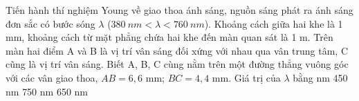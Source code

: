 \begin{vidu} %
 Tiến hành thí nghiệm Young về giao thoa ánh sáng, nguồn sáng phát ra ánh sáng đơn sắc có bước sóng $\lambda $ ($380\ nm < \lambda  < 760\ nm$). Khoảng cách giữa hai khe là 1 mm, khoảng cách từ mặt phẳng chứa hai khe đến màn quan sát là 1 m. Trên màn hai điểm A và B là vị trí vân sáng đối xứng với nhau qua vân trung tâm, C cũng là vị trí vân sáng. Biết A, B, C cùng nằm trên một đường thẳng vuông góc với các vân giao thoa, $AB = 6,6$ mm; $BC = 4,4$ mm. Giá trị của $\lambda $ bằng
\choice
{ nm}
{450 nm}
{750 nm}
{650 nm}
\end{vidu} %
